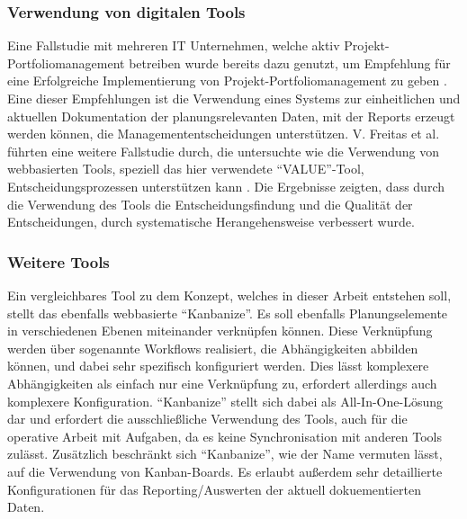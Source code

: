 \subsubsection{Verwendung von digitalen Tools}
Eine Fallstudie mit mehreren IT Unternehmen, welche aktiv Projekt-Portfoliomanagement betreiben wurde bereits dazu genutzt, um Empfehlung für eine Erfolgreiche Implementierung von Projekt-Portfoliomanagement zu geben \cite{guidelinesForPortfoliomanagement}.
Eine dieser Empfehlungen ist die Verwendung eines Systems zur einheitlichen und aktuellen Dokumentation der planungsrelevanten Daten, mit der Reports erzeugt werden können, die Managemententscheidungen unterstützen.
V. Freitas et al. führten eine weitere Fallstudie durch, die untersuchte wie die Verwendung von webbasierten Tools, speziell das hier verwendete ``VALUE''-Tool, Entscheidungsprozessen unterstützen kann \cite{Value-Based-Decision-Making-Case-Study}. Die Ergebnisse zeigten, dass durch die Verwendung des Tools die Entscheidungsfindung und die Qualität der Entscheidungen, durch systematische Herangehensweise verbessert wurde.

\subsubsection{Weitere Tools}
Ein vergleichbares Tool zu dem Konzept, welches in dieser Arbeit entstehen soll, stellt das ebenfalls webbasierte ``Kanbanize''. Es soll ebenfalls Planungselemente in verschiedenen Ebenen miteinander verknüpfen können. Diese Verknüpfung werden über sogenannte Workflows realisiert, die Abhängigkeiten abbilden können, und dabei sehr spezifisch konfiguriert werden. Dies lässt komplexere Abhängigkeiten als einfach nur eine Verknüpfung zu, erfordert allerdings auch komplexere Konfiguration. ``Kanbanize'' stellt sich dabei als All-In-One-Lösung dar und erfordert die ausschließliche Verwendung des Tools, auch für die operative Arbeit mit Aufgaben, da es keine Synchronisation mit anderen Tools zulässt. Zusätzlich beschränkt sich ``Kanbanize'', wie der Name vermuten lässt, auf die Verwendung von Kanban-Boards. Es erlaubt außerdem sehr detaillierte Konfigurationen für das Reporting/Auswerten der aktuell dokuementierten Daten.
